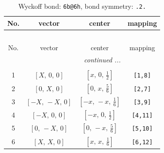 \documentclass[fleqn,8pt]{jsarticle}
\begin{document}
\begin{longtable}{cccc}
\caption{Wyckoff bond: {\tt 6b@6h}, bond symmetry: {\tt .2.}}
 \\
 \hline \hline
No. & vector & center & mapping \\ \hline \endfirsthead

\multicolumn{3}{l}{\tablename\ \thetable{}} \\
 \hline \hline
No. & vector & center & mapping \\ \hline \endhead

 \hline \hline
\multicolumn{3}{r}{\footnotesize\it continued ...} \\ \endfoot

 \hline \hline
\multicolumn{3}{r}{} \\ \endlastfoot

1 & $\left[ X,\, 0,\, 0 \right]$ & $\left[ x,\, 0,\, \frac{1}{2} \right]$ & {\tt [1,8]} \\ \hline
2 & $\left[ 0,\, X,\, 0 \right]$ & $\left[ 0,\, x,\, \frac{5}{6} \right]$ & {\tt [2,7]} \\ \hline
3 & $\left[ - X,\, - X,\, 0 \right]$ & $\left[ - x,\, - x,\, \frac{1}{6} \right]$ & {\tt [3,9]} \\ \hline
4 & $\left[ - X,\, 0,\, 0 \right]$ & $\left[ - x,\, 0,\, \frac{1}{2} \right]$ & {\tt [4,11]} \\ \hline
5 & $\left[ 0,\, - X,\, 0 \right]$ & $\left[ 0,\, - x,\, \frac{5}{6} \right]$ & {\tt [5,10]} \\ \hline
6 & $\left[ X,\, X,\, 0 \right]$ & $\left[ x,\, x,\, \frac{1}{6} \right]$ & {\tt [6,12]} \\
\end{longtable}
\renewcommand{\arraystretch}{1.2}
\end{document}
